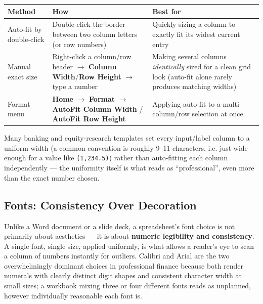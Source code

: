 \documentclass[11pt,a4paper]{article}
\begin{document}
\begin{center}
\begin{tabular}{@{}L{3.8cm}L{4.0cm}L{4.6cm}@{}}
\toprule
\textbf{Method} & \textbf{How} & \textbf{Best for} \\
\midrule
Auto-fit by double-click & Double-click the border between two column letters (or row numbers) & Quickly sizing a column to exactly fit its widest current entry \\
Manual exact size & Right-click a column/row header $\rightarrow$ \textbf{Column Width}/\textbf{Row Height} $\rightarrow$ type a number & Making several columns \emph{identically} sized for a clean grid look (auto-fit alone rarely produces matching widths) \\
Format menu & \textbf{Home} $\rightarrow$ \textbf{Format} $\rightarrow$ \textbf{AutoFit Column Width} / \textbf{AutoFit Row Height} & Applying auto-fit to a multi-column/row selection at once \\
\bottomrule
\end{tabular}
\end{center}

\begin{protip}
Many banking and equity-research templates set every input/label column to a uniform width (a common convention is roughly 9--11 characters, i.e. just wide enough for a value like \texttt{(1,234.5)}) rather than auto-fitting each column independently --- the uniformity itself is what reads as ``professional'', even more than the exact number chosen.
\end{protip}

\subsection{Fonts: Consistency Over Decoration}

\begin{keyconcept}
Unlike a Word document or a slide deck, a spreadsheet's font choice is not primarily about aesthetics --- it is about \textbf{numeric legibility and consistency}. A single font, single size, applied uniformly, is what allows a reader's eye to scan a column of numbers instantly for outliers. Calibri and Arial are the two overwhelmingly dominant choices in professional finance because both render numerals with clearly distinct digit shapes and consistent character width at small sizes; a workbook mixing three or four different fonts reads as unplanned, however individually reasonable each font is.
\end{keyconcept}
\end{document}
